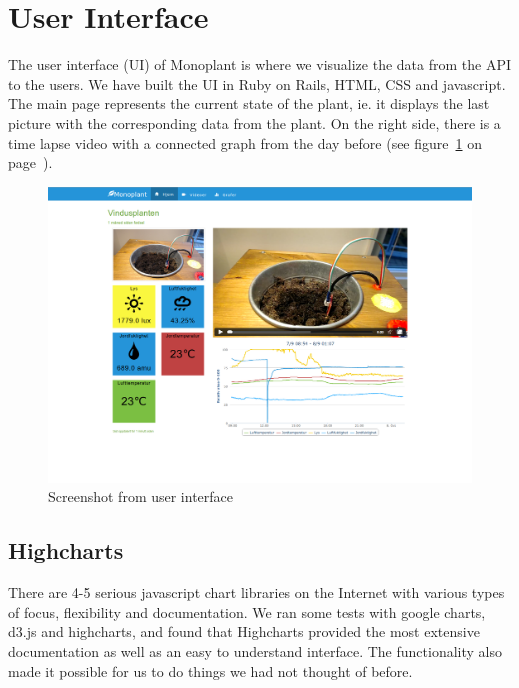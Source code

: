 


\section{User Interface}
The user interface (UI) of Monoplant is where we visualize the data from the API to the users. We have built the UI in Ruby on Rails, HTML, CSS and javascript. The main page represents the current state of the plant, ie. it displays the last picture with the corresponding data from the plant. On the right side, there is a time lapse video with a connected graph from the day before (see figure~\ref{fig:mainpage} on page~\pageref{fig:mainpage}).

\begin{figure}
\centering
\includegraphics[width=1\textwidth]{img/interface/mainpage.png}
\caption{Screenshot from user interface}
\label{fig:mainpage}
\end{figure}

\subsection{Highcharts}
There are 4-5 serious javascript chart libraries on the Internet with various types of focus, flexibility and documentation. We ran some tests with google charts, d3.js and highcharts, and found that Highcharts provided the most extensive documentation as well as an easy to understand interface. The functionality also made it possible for us to do things we had not thought of before.

